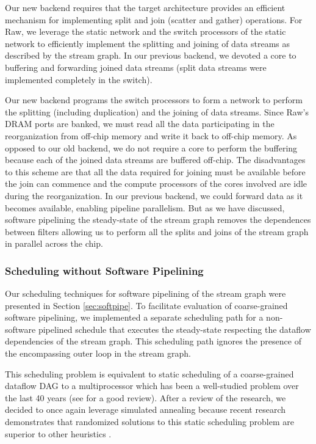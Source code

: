 Our new backend requires that the target architecture provides an
efficient mechanism for implementing split and join (scatter and
gather) operations.  For Raw, we leverage the static network and the
switch processors of the static network to efficiently implement the
splitting and joining of data streams as described by the stream
graph.  In our previous backend, we devoted a core to buffering and
forwarding joined data streams (split data streams were implemented
completely in the switch).

Our new backend programs the switch processors to form a network to
perform the splitting (including duplication) and the joining of data
streams.  Since Raw's DRAM ports are banked, we must read all the data
participating in the reorganization from off-chip memory and write it
back to off-chip memory.  As opposed to our old backend, we do not
require a core to perform the buffering because each of the joined
data streams are buffered off-chip.  The disadvantages to this scheme
are that all the data required for joining must be available before
the join can commence and the compute processors of the cores involved
are idle during the reorganization.  In our previous backend, we could
forward data as it becomes available, enabling pipeline parallelism.
But as we have discussed, software pipelining the steady-state of the
stream graph removes the dependences between filters allowing us to
perform all the splits and joins of the stream graph in parallel
across the chip.


\subsubsection{Scheduling without Software Pipelining}
Our scheduling techniques for software pipelining of the stream graph
were presented in Section \ref{sec:softpipe}.  To facilitate
evaluation of coarse-grained software pipelining, we implemented a
separate scheduling path for a non-software pipelined schedule that
executes the steady-state respecting the dataflow dependencies of the
stream graph.  This scheduling path ignores the presence of the
encompassing outer loop in the stream graph.    

This scheduling problem is equivalent to static scheduling of a
coarse-grained dataflow DAG to a multiprocessor which has been a
well-studied problem over the last 40 years (see \cite{DAGSched} for a
good review).  After a review of the research, we decided to once
again leverage simulated annealing because recent research
demonstrates that randomized solutions to this static scheduling
problem are superior to other heuristics \cite{kwok99fastest}. 

